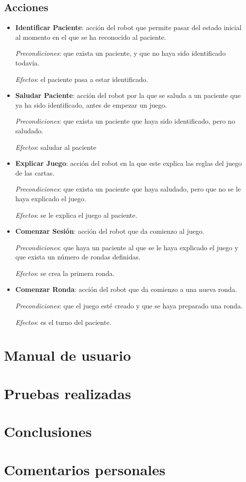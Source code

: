 \documentclass{uc3mpracticas}
\begin{document}
  \subsection{Acciones}

  \begin{itemize}
    \item \textbf{Identificar Paciente}: acción del robot que permite pasar del estado inicial al momento en el que se ha reconocido al paciente.

      \textit{Precondiciones}: que exista un paciente, y que no haya sido identificado todavía.

      \textit{Efectos}: el paciente pasa a estar identificado.

    \item \textbf{Saludar Paciente}: acción del robot por la que se saluda a un paciente que ya ha sido identificado, antes de empezar un juego.

      \textit{Precondiciones}: que exista un paciente que haya sido identificado, pero no saludado.

      \textit{Efectos}: saludar al paciente

    \item \textbf{Explicar Juego}: acción del robot en la que este explica las reglas del juego de las cartas.

      \textit{Precondiciones}: que exista un paciente que haya saludado, pero que no se le haya explicado el juego.

      \textit{Efectos}: se le explica el juego al paciente.

    \item \textbf{Comenzar Sesión}: acción del robot que da comienzo al juego.

      \textit{Precondiciones}: que haya un paciente al que se le haya explicado el juego y que exista un número de rondas definidas.

      \textit{Efectos}: se crea la primera ronda.

    \item \textbf{Comenzar Ronda}: acción del robot que da comienzo a una nueva ronda.

      \textit{Precondiciones}: que el juego esté creado y que se haya preparado una ronda.

      \textit{Efectos}: es el turno del paciente.

  \end{itemize}









  \section{Manual de usuario}


  \section{Pruebas realizadas}


  \section{Conclusiones}


  \section{Comentarios personales}
\end{document}

